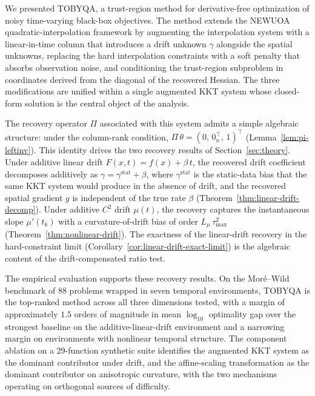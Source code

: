 \documentclass[11pt,a4paper]{article}
\begin{document}
We presented TOBYQA, a trust-region method for derivative-free
optimization of noisy time-varying black-box objectives. The
method extends the NEWUOA quadratic-interpolation framework by
augmenting the interpolation system with a linear-in-time column
that introduces a drift unknown $\gamma$ alongside the spatial
unknowns, replacing the hard interpolation constraints with a
soft penalty that absorbs observation noise, and conditioning
the trust-region subproblem in coordinates derived from the
diagonal of the recovered Hessian. The three modifications are
unified within a single augmented KKT system whose closed-form
solution is the central object of the analysis.

The recovery operator $\Pi$ associated with this system admits a
simple algebraic structure: under the column-rank condition,
$\Pi\,\theta = (0,\, 0_n^\top,\, 1)^\top$
(Lemma~\ref{lem:pi-leftinv}). This identity drives the two
recovery results of Section~\ref{sec:theory}. Under additive
linear drift $F(x, t) = f(x) + \beta\,t$, the recovered drift
coefficient decomposes additively as
$\gamma = \gamma^{\mathrm{stat}} + \beta$, where
$\gamma^{\mathrm{stat}}$ is the static-data bias that the same
KKT system would produce in the absence of drift, and the
recovered spatial gradient $g$ is independent of the true rate
$\beta$ (Theorem~\ref{thm:linear-drift-decomp}). Under additive
$C^2$ drift $\mu(t)$, the recovery captures the instantaneous
slope $\mu'(t_k)$ with a curvature-of-drift bias of order
$L_\mu\,\tau_{\max}^2$
(Theorem~\ref{thm:nonlinear-drift}). The exactness of the
linear-drift recovery in the hard-constraint limit
(Corollary~\ref{cor:linear-drift-exact-limit}) is the algebraic
content of the drift-compensated ratio test.

The empirical evaluation supports these recovery results. On the
Mor\'e--Wild benchmark of $88$ problems wrapped in seven temporal
environments, TOBYQA is the top-ranked method across all three
dimensions tested, with a margin of approximately $1.5$ orders
of magnitude in mean $\log_{10}$ optimality gap over the
strongest baseline on the additive-linear-drift environment and
a narrowing margin on environments with nonlinear temporal
structure. The component ablation on a $29$-function synthetic
suite identifies the augmented KKT system as the dominant
contributor under drift, and the affine-scaling transformation
as the dominant contributor on anisotropic curvature, with the
two mechanisms operating on orthogonal sources of difficulty.
\end{document}
